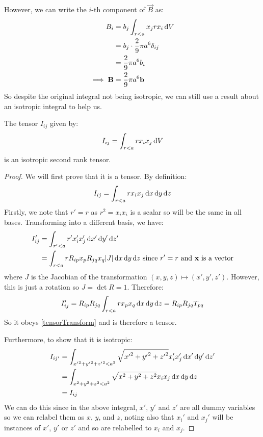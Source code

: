 \documentclass[../main.tex]{subfiles}
\begin{document}
However, we can write the $i$-th component of $\vec{B}$ as:
\begin{align*}
  B_i &= b_j \int_{r < a} x_j r x_i \d{V} \\
      &= b_j \cdot \frac{2}{9}\pi a^{6} \delta_{i j} \\
      &= \frac{2}{9} \pi a^{6} b_i \\
  \implies \vec{B} &= \frac{2}{9} \pi a^6 \vec{b}
\end{align*}
So despite the original integral not being isotropic, we can still use a result about an isotropic integral to help us.
\begin{proposition}
  The tensor $I_{i j}$ given by: \label{isotropyProof}
  \[
    I_{i j} = \int_{r < a} rx_ix_j \d{V}
  \]
  is an isotropic second rank tensor.
\end{proposition}
\begin{proof}
  \nonexaminable
  We will first prove that it is a tensor.
  By definition:
  \[
    I_{i j} = \int_{r < a} rx_ix_j \d{x} \d{y} \d{z}
  \]
  Firstly, we note that $r' = r$ as $r^2 = x_ix_i$ is a scalar so will be the same in all bases.
  Transforming into a different basis, we have:
  \begin{align*}
    I_{i j}' &= \int_{r' < a} r'x_i'x_j' \d{x'}\d{y'}\d{z'} \\
             &= \int_{r < a} r R_{i p} x_p R_{j q}x_q |J| \d{x}\d{y}\d{z} \text{ since $r' = r$ and $\vec{x}$ is a vector}
  \end{align*}
  where $J$ is the Jacobian of the transformation $(x, y, z) \mapsto (x', y', z')$.
  However, this is just a rotation so $J = \det R = 1$.
  Therefore:
  \[
    I_{i j}' = R_{i p}R_{j q}\int_{r < a}  rx_p x_q \d{x}\d{y}\d{z} = R_{i p}R_{j q}T_{p q}
  \]
  So it obeys \cref{tensorTransform} and is therefore a tensor.

  Furthermore, to show that it is isotropic:
  \begin{align*}
    I_{i j'} &= \int_{{x'}^2 + {y'}^2 + {z'}^2 < a^2}  \sqrt{{x'}^2 + {y'}^2 + {z'}^2}x_i'x_j'\d{x'}\d{y'}\d{z'} \\
             &= \int_{x^2 + y^2 + z^2 < a^2} \sqrt{x^2 + y^2 + z^2}x_ix_j \d{x}\d{y}\d{z} \\
             &= I_{i j}
  \end{align*}
  We can do this since in the above integral, $x'$, $y'$ and $z'$ are all dummy variables so we can relabel them as $x$, $y$, and $z$, noting also that $x_i'$ and $x_j'$ will be instances of $x'$, $y'$ or $z'$ and so are relabelled to $x_i$ and $x_j$.
\end{proof}
\end{document}
